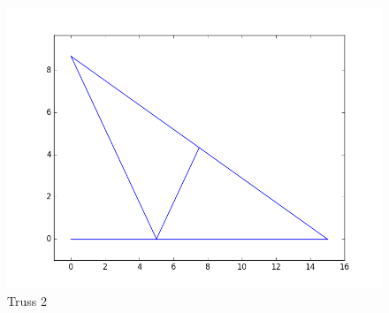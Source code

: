 \documentclass{article}
\begin{document}
\begin{figure}[htb]
  \begin{center}
    \includegraphics[width=0.75\linewidth]{truss2.png}
    \caption{Truss 2}
    \label{fig:truss2}
  \end{center}
\end{figure}
\end{document}
